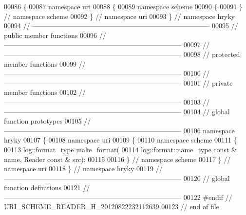 \begin{DoxyCode}
00086 \{
00087 \textcolor{keyword}{namespace }uri
00088 \{
00089 \textcolor{keyword}{namespace }scheme
00090 \{
00091 \} \textcolor{comment}{// namespace scheme}
00092 \} \textcolor{comment}{// namespace uri}
00093 \} \textcolor{comment}{// namespace hryky}
00094 \textcolor{comment}{//
      ------------------------------------------------------------------------------}
00095 \textcolor{comment}{// public member functions}
00096 \textcolor{comment}{//
      ------------------------------------------------------------------------------}
00097 \textcolor{comment}{//
      ------------------------------------------------------------------------------}
00098 \textcolor{comment}{// protected member functions}
00099 \textcolor{comment}{//
      ------------------------------------------------------------------------------}
00100 \textcolor{comment}{//
      ------------------------------------------------------------------------------}
00101 \textcolor{comment}{// private member functions}
00102 \textcolor{comment}{//
      ------------------------------------------------------------------------------}
00103 \textcolor{comment}{//
      ------------------------------------------------------------------------------}
00104 \textcolor{comment}{// global function prototypes}
00105 \textcolor{comment}{//
      ------------------------------------------------------------------------------}
00106 \textcolor{keyword}{namespace }hryky
00107 \{
00108 \textcolor{keyword}{namespace }uri
00109 \{
00110 \textcolor{keyword}{namespace }scheme
00111 \{
00113     \hyperlink{namespacehryky_1_1log_ad50448c3f934f1eacd5c1bcffe8111e1}{log::format_type} \hyperlink{namespacehryky_1_1uri_a4c47d905f62ff90b7026c9f3f6544a9b}{make_format}(
00114         \hyperlink{namespacehryky_1_1log_1_1format_ab7408d1e2ed2d648dbf9bba69eb74288}{log::format::name_type} \textcolor{keyword}{const} & name, Reader \textcolor{keyword}{const} & src);
00115 
00116 \} \textcolor{comment}{// namespace scheme}
00117 \} \textcolor{comment}{// namespace uri}
00118 \} \textcolor{comment}{// namespace hryky}
00119 \textcolor{comment}{//
      ------------------------------------------------------------------------------}
00120 \textcolor{comment}{// global function definitions}
00121 \textcolor{comment}{//
      ------------------------------------------------------------------------------}
00122 \textcolor{preprocessor}{#endif // URI\_SCHEME\_READER\_H\_20120822232112639}
00123 \textcolor{preprocessor}{}\textcolor{comment}{// end of file}
\end{DoxyCode}
